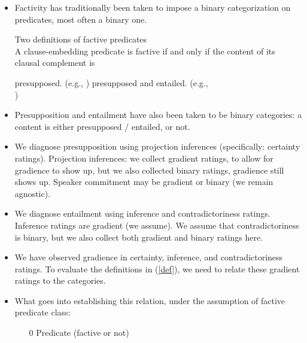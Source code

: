 \documentclass[11pt,fleqn]{article}
\newcommand{\6}{\mbox{$[\hspace*{-.6mm}[$}}
\newcommand{\9}{\mbox{$]\hspace*{-.6mm}]$}}
\begin{document}
\begin{itemize}

\item Factivity has traditionally been taken to impose a binary categorization on predicates, most often a binary one. 

\begin{exe}
\exi{(\ref{def})} Two definitions of factive predicates \\ A clause-embedding predicate is factive if and only if the content of its clausal complement is 
\begin{xlist}
\ex presupposed. \hfill (e.g., \citealt{kiparsky-kiparsky70,karttunen71-implicative,karttunen71b})
\ex presupposed and entailed.  \hfill (e.g., \citealt{gazdar79a,schlenker10,abrusan2011}\\\hspace*{.2cm}\hfill \citealt{anand-hacquard2014,spector-egre2015})
\end{xlist}
\end{exe}

\item Presupposition and entailment have also been taken to be binary categories: a content is either presupposed / entailed, or not.

\item We diagnose presupposition using projection inferences (specifically: certainty ratings). Projection inferences: we collect gradient ratings, to allow for gradience to show up, but we also collected binary ratings, gradience still shows up. Speaker commitment may be gradient or binary (we remain agnostic).

\item We diagnose entailment using inference and contradictoriness ratings. Inference ratings are gradient (we assume). We assume that contradictoriness is binary, but we also collect both gradient and binary ratings here.

\item We have observed gradience in certainty, inference, and contradictoriness ratings. To evaluate the definitions in (\ref{def}), we need to relate these gradient ratings to the categories.

\item What goes into establishing this relation, under the assumption of factive predicate class:

\begin{enumerate}

\item[0] Predicate (factive or not)


\end{enumerate}
\end{itemize}
\end{document}
